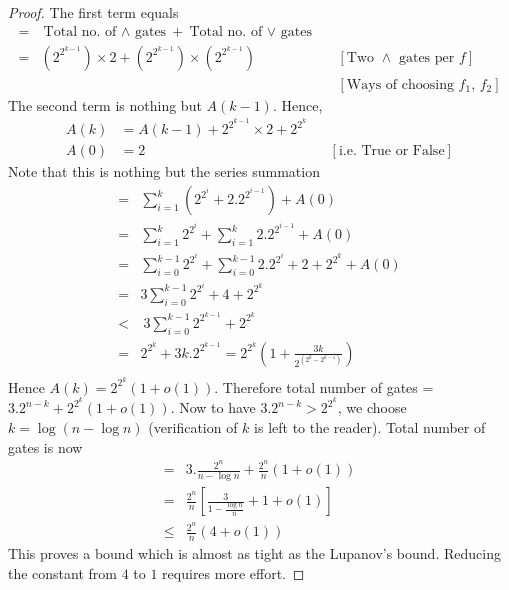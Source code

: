 \begin{proof}
The first term equals
\begin{align*}
= & \text{Total no. of $\land$ gates} + \text{Total no. of $\lor$ gates}  \\
= & (2^{2^{k-1}}) \times 2 +  (2^{2^{k-1}}) \times (2^{2^{k-1}}) 
&& [\text{Two $\land$ gates per $f$}] \\
& && [\text{Ways of choosing $f_1$, $f_2$}] 
\end{align*}
The second term is nothing but $A(k-1)$. Hence,
\begin{align*}
A(k) &=  A(k-1) + 2^{2^{k-1}} \times 2 + 2^{2^k} \\
A(0) &= 2 &&[\text{i.e. True or False}] 
\end{align*}
Note that this is nothing but the series summation
\begin{align*}
= & \sum_{i=1}^k (2^{2^i} + 2.2^{2^{i-1}}) + A(0) \\
= & \sum_{i=1}^k 2^{2^i} + \sum_{i=1}^k 2.2^{2^{i-1}} + A(0) \\
= & \sum_{i=0}^{k-1} 2^{2^i} + \sum_{i=0}^{k-1} 2.2^{2^i} + 2 + 2^{2^k} + A(0)
\\
= & 3\sum_{i=0}^{k-1} 2^{2^i} + 4 + 2^{2^k} \\
< &~3\sum_{i=0}^{k-1} 2^{2^{k-1}} + 2^{2^k} \\
= & 2^{2^k}+ 3k.2^{2^{k-1}} = 2^{2^k} \left ( 1 + \frac{3k}{2^{({2^k} -
2^{k-1})}}  \right )\\
\end{align*}
Hence $A(k) =  2^{2^k}(1+ o(1))$. Therefore total number of gates = $3.2^{n-k}
+ 2^{2^k}(1+o(1))$. Now to have $3.2^{n-k} > 2^{2^k}$, we choose $k = \log (n
- \log n)$ (verification of $k$ is left to the reader). 
Total number of gates is now
\begin{align*}
= & 3.\frac{2^n}{n-\log n} + \frac{2^n}{n}(1+o(1)) \\
= & \frac{2^n}{n} \left [ \frac{3}{1-\frac{\log n}{n}} + 1 + o(1)\right ] \\
\le & \frac{2^n}{n}(4 + o(1))
\end{align*}
This proves a bound which is almost as tight as the Lupanov's bound. Reducing
the constant from $4$ to $1$ requires more effort.
\end{proof}

